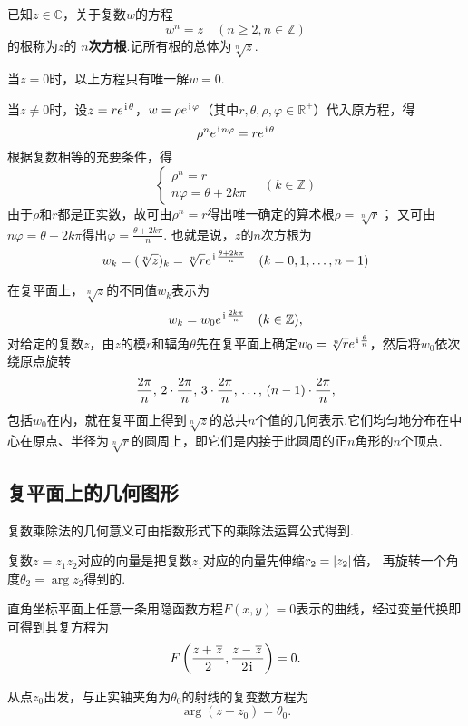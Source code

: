 \begin{definition}[复数的方根]
已知\(z\in\mathbb{C}\)，关于复数\(w\)的方程\[
w^n = z \quad (n \geqslant 2, n \in \mathbb{Z})
\]的根称为\(z\)的\textbf{ \(n\)次方根}.记所有根的总体为\(\sqrt[n]{z}\).

当\(z=0\)时，以上方程只有唯一解\(w = 0\).

当\(z \neq 0\)时，设\(z=re^{\kern1pt\mathrm{i}\kern1pt\theta}\)，\(w=\rho e^{\kern1pt\mathrm{i}\kern1pt\varphi}\)（其中\(r,\theta,\rho,\varphi\in\mathbb{R}^+\)）代入原方程，得\[
\rho^n e^{\kern1pt\mathrm{i}\kern1pt n \varphi} = r e^{\kern1pt\mathrm{i}\kern1pt\theta}
\]根据复数相等的充要条件，得\[
\left\{ \begin{array}{l}
\rho^n = r \\
n\varphi = \theta + 2k\pi
\end{array} \right. \quad (k \in \mathbb{Z})
\]由于\(\rho\)和\(r\)都是正实数，故可由\(\rho^n=r\)得出唯一确定的算术根\(\rho=\sqrt[n]{r}\)；
又可由\(n\varphi=\theta+2k\pi\)得出\(\varphi=\frac{\theta+2k\pi}{n}\).
也就是说，\(z\)的\(n\)次方根为\[
w_k = (\sqrt[n]{z})_k = \sqrt[n]{r} e^{\kern1pt\mathrm{i}\kern1pt \frac{\theta + 2k\pi}{n}} \quad (k=0,1,\dotsc,n-1)
\]
\end{definition}

在复平面上，\(\sqrt[n]{z}\)的不同值\(w_k\)表示为\[
w_k = w_0 e^{\kern1pt\mathrm{i}\kern1pt\frac{2k\pi}{n}} \quad (k \in \mathbb{Z}),
\]对给定的复数\(z\)，由\(z\)的模\(r\)和辐角\(\theta\)先在复平面上确定\(w_0 = \sqrt[n]{r} e^{\kern1pt\mathrm{i}\kern1pt\frac{\theta}{n}}\)，然后将\(w_0\)依次绕原点旋转\[
\def\f{\frac{2\pi}{n}}
\f,\,2\cdot\f,\,3\cdot\f,\,\dots,\,(n-1)\cdot\f,
\]包括\(w_0\)在内，就在复平面上得到\(\sqrt[n]{z}\)的总共\(n\)个值的几何表示.它们均匀地分布在中心在原点、半径为\(\sqrt[n]{r}\)的圆周上，即它们是内接于此圆周的正\(n\)角形的\(n\)个顶点.

\subsection{复平面上的几何图形}
复数乘除法的几何意义可由指数形式下的乘除法运算公式得到.

复数\(z=z_1 z_2\)对应的向量是把复数\(z_1\)对应的向量先伸缩\(r_2 = \abs{z_2}\)倍，%
再旋转一个角度\(\theta_2 = \arg z_2\)得到的.

直角坐标平面上任意一条用隐函数方程\(F(x,y)=0\)表示的曲线，经过变量代换即可得到其复方程为\[
F\left(\frac{z+\kern1pt\overline{z}\kern1pt}{2},\frac{z-\kern1pt\overline{z}\kern1pt}{2\kern1pt\mathrm{i}\kern1pt}\right)=0.
\]

\begin{example}[射线]
从点\(z_0\)出发，与正实轴夹角为\(\theta_0\)的射线的复变数方程为\[
\arg(z-z_0) = \theta_0.
\]
\end{example}

